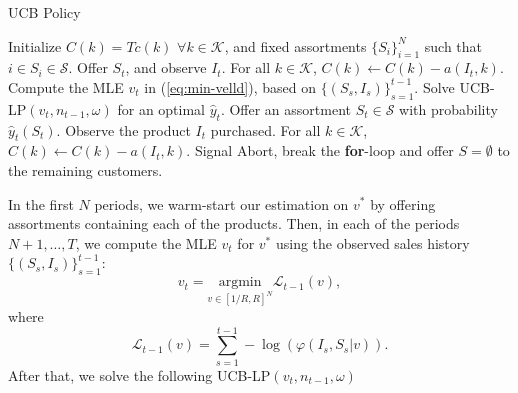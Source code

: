 \documentclass{article}
\theoremstyle{definition}
\newcommand{\KKK}{\mathcal{K}}
\newcommand{\SSS}{\mathcal{S}}
\begin{document}
\begin{algorithm}[H]
\caption{UCB Policy}\label{alg:UCB}
\begin{algorithmic}[1]
\State Initialize $C(k) = Tc(k)$ $\forall k\in \KKK$, and fixed assortments $\{S_i\}^N_{i=1}$ such that $i\in S_i\in \SSS$. \label{alg:UCB_line1}
\State Offer $S_t$, and observe $I_t$. 
\State For all $k\in \KKK$, $C(k)\leftarrow C(k) - a(I_t, k)$. \label{alg:UCB_resource}
\EndFor 
{}\label{alg:UCB_secondfor}
\State Compute the MLE $v_t$ in (\ref{eq:min-velld}), based on $\{(S_s, I_s)\}^{t-1}_{s = 1}$.
\State Solve UCB-LP$(v_t, n_{t-1}, \omega)$ for an optimal  $\hat{y}_t$.
\State Offer an assortment $S_t\in \SSS$ with probability $\hat{y}_t(S_t)$.
\State Observe the product $I_t$ purchased.
\State For all $k\in \KKK$, $C(k)\leftarrow C(k) - a(I_t, k)$. \label{alg:UCB_resource2}
\If{$\exists k\in \KKK\text{ s.t. }C(k) = 0$}
\State Signal {\sc Abort}, break the \textbf{for}-loop and offer $S = \emptyset$ to the remaining customers.
\EndIf
\EndFor
\end{algorithmic}
\end{algorithm}
In the first $N$ periods, we warm-start our estimation on $v^*$ by offering assortments containing each of the products. Then, in each of the periods $N+1, \ldots, T$, we compute the MLE $v_t$ for $v^*$ using the observed sales history $\{(S_s, I_s)\}^{t-1}_{s = 1}$:
\begin{equation}\label{eq:min-velld}
v_t = \underset{ v \in[1/R, R]^N }{\text{argmin}}\mathcal{L}_{t - 1}(v) , 
\end{equation}
where 
\begin{equation}\label{eq:-veloglikelihood}
\mathcal{L}_{t-1}(v) = \sum^{t-1}_{s=1} - \log(\varphi(I_s, S_s|v)).
\end{equation}
After that, we solve the following UCB-LP$(v_t, n_{t-1}, \omega)$ 
\end{document}
